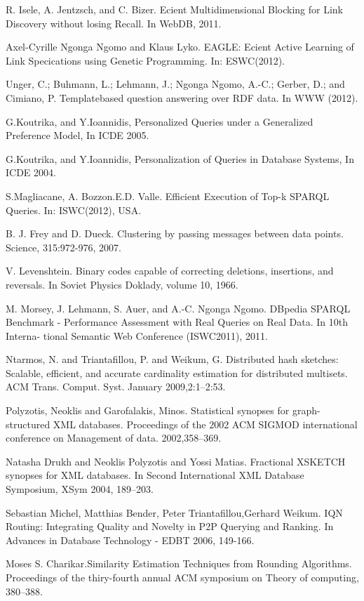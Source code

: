 \documentclass{sig-alternate}  %
\begin{document}
\begin{thebibliography}{10}
 R. Isele, A. Jentzsch, and C. Bizer. Ecient Multidimensional
Blocking for Link Discovery without losing Recall. In WebDB, 2011.

Axel-Cyrille Ngonga Ngomo and Klaus Lyko. EAGLE:
Ecient Active Learning of Link Specications using Genetic Programming.
In: ESWC(2012).

Unger, C.; Buhmann, L.; Lehmann, J.; Ngonga Ngomo,
A.-C.; Gerber, D.; and Cimiano, P. Templatebased question answering
over RDF data. In WWW (2012).

G.Koutrika, and Y.Ioannidis, Personalized Queries
under a Generalized Preference Model, In ICDE 2005.

G.Koutrika, and Y.Ioannidis, Personalization of Queries
in Database Systems, In ICDE 2004.

S.Magliacane, A. Bozzon.E.D. Valle. Efficient Execution
of Top-k SPARQL Queries. In: ISWC(2012), USA. 

B. J. Frey and D. Dueck. Clustering by passing messages
between data points. Science, 315:972-976, 2007.

 V. Levenshtein. Binary codes capable of correcting
deletions, insertions, and reversals. In Soviet Physics Doklady, volume
10, 1966.

M. Morsey, J. Lehmann, S. Auer, and A.-C. {Ngonga Ngomo}.
DBpedia SPARQL Benchmark - Performance Assessment with Real Queries
on Real Data. In 10th Interna- tional Semantic Web Conference (ISWC2011),
2011.

Ntarmos, N. and Triantafillou, P. and Weikum, G.
Distributed hash sketches: Scalable, efficient, and accurate cardinality estimation for distributed multisets. ACM Trans. Comput. Syst.
January 2009,2:1--2:53.

Polyzotis, Neoklis and Garofalakis, Minos. Statistical synopses for graph-structured XML databases. Proceedings of the 2002 ACM SIGMOD international conference on Management of data. 2002,358--369. 

Natasha Drukh and Neoklis Polyzotis and Yossi Matias. Fractional XSKETCH synopses for XML databases. In Second International XML Database Symposium, XSym 2004, 189--203.

Sebastian Michel, Matthias Bender, Peter Triantafillou,Gerhard Weikum. IQN Routing: Integrating Quality and Novelty in P2P Querying and Ranking. In Advances in Database Technology - EDBT 2006, 149-166.

Moses S. Charikar.Similarity Estimation Techniques from Rounding
Algorithms. Proceedings of the thiry-fourth annual ACM symposium on Theory of computing, 380--388.


\end{thebibliography}
\end{document}
